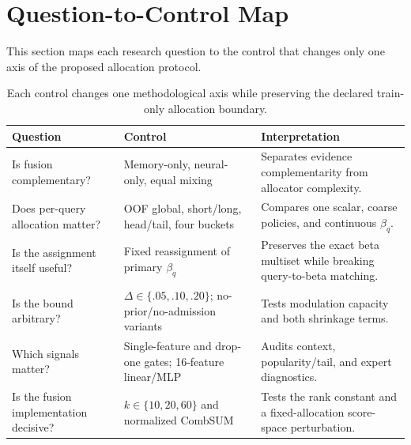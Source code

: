 \documentclass[runningheads]{llncs}
\begin{document}
\section{Question-to-Control Map}
This section maps each research question to the control that changes only one
axis of the proposed allocation protocol.
\begin{table}[h]
\caption{Each control changes one methodological axis while preserving the
declared train-only allocation boundary.}
\label{tab:question-control-map}
\centering\small
\begin{tabular}{
>{\raggedright\arraybackslash}p{}
>{\raggedright\arraybackslash}p{}
>{\raggedright\arraybackslash}p{}}
\toprule
Question & Control & Interpretation\\
\midrule
Is fusion complementary? &
Memory-only, neural-only, equal mixing &
Separates evidence complementarity from allocator complexity.\\
Does per-query allocation matter? &
OOF global, short/long, head/tail, four buckets &
Compares one scalar, coarse policies, and continuous $\beta_q$.\\
Is the assignment itself useful? &
Fixed reassignment of primary $\beta_q$ &
Preserves the exact beta multiset while breaking query-to-beta matching.\\
Is the bound arbitrary? &
$\Delta\in\{.05,.10,.20\}$; no-prior/no-admission variants &
Tests modulation capacity and both shrinkage terms.\\
Which signals matter? &
Single-feature and drop-one gates; 16-feature linear/MLP &
Audits context, popularity/tail, and expert diagnostics.\\
Is the fusion implementation decisive? &
$k\in\{10,20,60\}$ and normalized CombSUM &
Tests the rank constant and a fixed-allocation score-space perturbation.\\
\bottomrule
\end{tabular}
\end{table}
\end{document}
